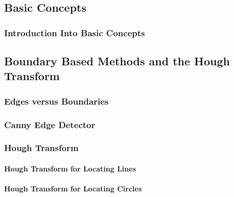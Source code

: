 \subsection{Basic Concepts} 
\label{booksection_59_Basic_Concepts}
\subsubsection{Introduction Into Basic Concepts} 
\label{booksection_60_Introduction_Into_Basic_Concepts}

\subsection{Boundary Based Methods and the Hough Transform } 
\label{booksection_61_Boundary_Based_Methods_and_the_Hough_Transform_}
\subsubsection{Edges versus Boundaries} 
\label{booksection_62_Edges_versus_Boundaries}

\subsubsection{Canny Edge Detector} 
\label{booksection_63_Canny_Edge_Detector}

\subsubsection{Hough Transform } 
\label{booksection_64_Hough_Transform_}
\paragraph{Hough Transform for Locating Lines} 
\label{booksection_65_Hough_Transform_for_Locating_Lines}

\paragraph{Hough Transform for Locating Circles} 
\label{booksection_66_Hough_Transform_for_Locating_Circles}

